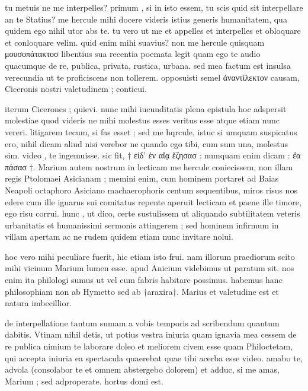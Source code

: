 


 tu metuis ne me interpelles? primum , si in isto essem, tu scis quid sit interpellare an te Statius? me hercule mihi docere videris istius generis humanitatem, qua quidem ego nihil utor abs te. tu vero ut me et appelles et interpelles et obloquare et conloquare velim. quid enim mihi suavius? non me hercule quisquam μουσοπάτακτοσ libentius sua recentia poemata legit quam ego te audio quacumque de re, publica, privata, rustica, urbana. sed mea factum est insulsa verecundia ut te proficiscens non tollerem. opposuisti semel ἀναντίλεκτον causam, Ciceronis nostri valetudinem ; conticui.

 iterum Cicerones ; quievi. nunc mihi iucunditatis plena epistula hoc adspersit molestiae quod videris ne mihi molestus esses veritus esse atque etiam nunc vereri. litigarem tecum, si fas esset ; sed me hqrcule, istuc si umquam suspicatus ero, nihil dicam aliud nisi verebor ne quando ego tibi, cum sum una, molestus sim. video , te ingemuisse. sic fit, † εἰδ' ἐν αἴᾳ ἔζησασ : numquam enim dicam : ἔα πάσασ †. Marium autem nostrum in lecticam me hercule coniecissem, non illam regis Ptolomaei Asicianam ; memini enim, cum hominem portaret ad Baias Neapoli octaphoro Asiciano machaerophoris centum sequentibus, miros risus nos edere cum ille ignarus sui comitatus repente aperuit lecticam et paene ille timore, ego risu corrui. hunc , ut dico, certe sustulissem ut aliquando subtilitatem veteris urbanitatis et humanissimi sermonis attingerem ; sed hominem infirmum in villam apertam ac ne rudem quidem etiam nunc invitare nolui.

 hoc vero mihi peculiare fuerit, hic etiam isto frui. nam illorum praediorum scito mihi vicinum Marium lumen esse. apud Anicium videbimus ut paratum sit. nos enim ita philologi sumus ut vel cum fabris habitare possimus. habemus hanc philosophiam non ab Hymetto sed ab †araxira†. Marius et valetudine est et natura imbecillior.

 de interpellatione tantum sumam a vobis temporis ad scribendum quantum dabitis. Vtinam nihil detis, ut potius vestra iniuria quam ignavia mea cessem de re publica nimium te laborare doleo et meliorem civem esse quam Philoctetam, qui accepta iniuria ea spectacula quaerebat quae tibi acerba esse video. amabo te, advola (consolabor te et omnem abstergebo dolorem) et adduc, si me amas, Marium ; sed adproperate. hortus domi est.
